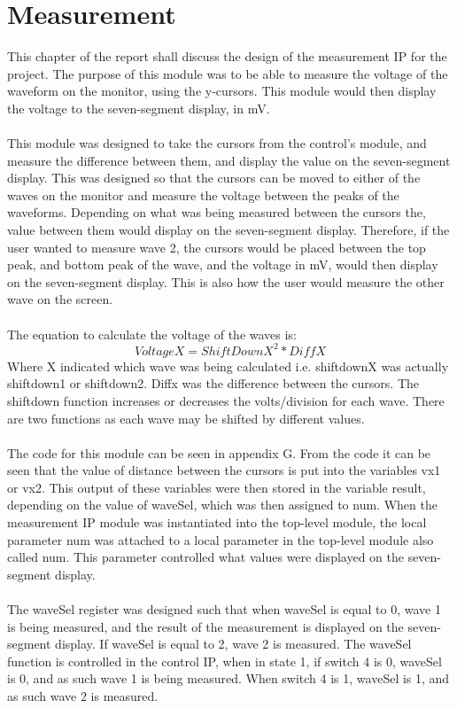 \documentclass[a4paper,12pt]{article}
\begin{document}
\section{Measurement}
\begin{flushleft}
This chapter of the report shall discuss the design of the measurement IP for the project. The purpose of this module was to be able to measure the voltage of the waveform on the monitor, using the y-cursors. This module would then display the voltage to the seven-segment display, in mV. \\ \- \\
This module was designed to take the cursors from the control’s module, and measure the difference between them, and display the value on the seven-segment display. This was designed so that the cursors can be moved to either of the waves on the monitor and measure the voltage between the peaks of the waveforms. Depending on what was being measured between the cursors the, value between them would display on the seven-segment display. Therefore, if the user wanted to measure wave 2, the cursors would be placed between the top peak, and bottom peak of the wave, and the voltage in mV, would then display on the seven-segment display. This is also how the user would measure the other wave on the screen. \\ \- \\
The equation to calculate the voltage of the waves is:
\begin{equation}
VoltageX = ShiftDownX^{2} * DiffX
\end{equation}
Where X indicated which wave was being calculated i.e. shiftdownX was actually shiftdown1 or shiftdown2. Diffx was the difference between the cursors. The shiftdown function increases or decreases the volts/division for each wave. There are two functions as each wave may be shifted by different values. \\ \- \\
The code for this module can be seen in appendix G. From the code it can be seen that the value of distance between the cursors is put into the variables vx1 or vx2. This output of these variables were then stored in the variable result, depending on the value of waveSel, which was then assigned to num. When the measurement IP module was instantiated into the top-level module, the local parameter num was attached to a local parameter in the top-level module also called num. This parameter controlled what values were displayed on the seven-segment display. \\ \- \\
The waveSel register was designed such that when waveSel is equal to 0, wave 1 is being measured, and the result of the measurement is displayed on the seven-segment display. If waveSel is equal to 2, wave 2 is measured. The waveSel function is controlled in the control IP, when in state 1, if switch 4 is 0, waveSel is 0, and as such wave 1 is being measured. When switch 4 is 1, waveSel is 1, and as such wave 2 is measured.  
\end{flushleft}
\newpage
\end{document}
